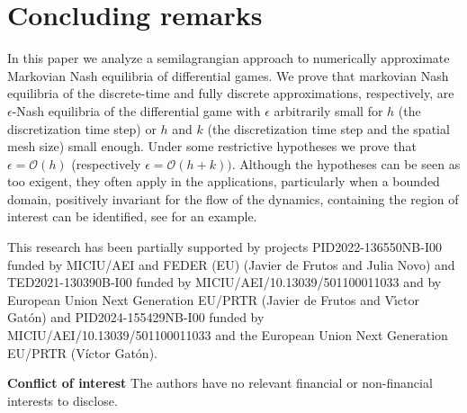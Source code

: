 \documentclass[12pt]{article}
\newcounter{remark}
\begin{document}
\section{Concluding remarks}

In this paper we analyze a semilagrangian approach to numerically approximate  Markovian Nash equilibria of differential games. We prove that markovian Nash equilibria of the discrete-time and fully discrete approximations, respectively, are $\epsilon$-Nash equilibria of the differential game with $\epsilon$ arbitrarily small for $h$ (the discretization time step) or $h$ and $k$ (the
discretization time step and the spatial mesh size) small enough. Under some restrictive hypotheses we prove that $\epsilon=\mathcal{O}(h)$
(respectively $\epsilon=\mathcal{O}(h+k))$. Although the hypotheses can be seen as too exigent, they often apply in the applications, particularly when a bounded domain, positively invariant for the flow of the dynamics, containing the region of interest can be identified, see \cite{DeFrutos2018} for an example.
\bigskip


  This research has been partially supported by projects   PID2022-136550NB-I00 funded by MICIU/AEI and FEDER (EU) (Javier de Frutos and Julia Novo) and TED2021-130390B-I00 funded by MICIU/AEI/10.13039/501100011033 and by European Union Next Generation EU/PRTR (Javier de Frutos and V\'{\i}ctor Gat\'{o}n)
and PID2024-155429NB-I00 funded by MICIU/AEI/10.13039/501100011033 and the European Union Next Generation EU/PRTR (V\'ictor Gat\'on).
\bigskip


{\bf Conflict of interest} The authors have no relevant financial or non-financial interests to disclose.
\bigskip
\end{document}
